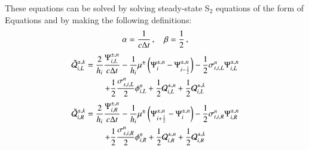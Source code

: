\documentclass[preprint,12pt]{elsarticle}
\begin{document}
These equations can be solved by solving steady-state S$_2$ equations
of the form of Equations  and  by making
the following definitions:
\begin{equation}
  \alpha = \frac{1}{c\Delta t} \, , \quad \beta = \frac{1}{2}\, ,
\end{equation}
\begin{multline}
  \tilde{\mathcal{Q}}_{i,L}^{\pm,k}
  = \frac{2}{h_i}\frac{\Psi_{i,L}^{\pm,n}}{c\Delta t}
  - \frac{1}{h_i}\mu^\pm\left( \Psi_i^{\pm,n} - \Psi_{i-\frac{1}{2}}^{\pm,n} \right)
  - \frac{1}{2}\sigma_{t,i,L}^n\Psi_{i,L}^{\pm,n}\\
  + \frac{1}{2}\frac{\sigma_{s,i,L}^n}{2}\phi_{i,L}^n
  + \frac{1}{2}\mathcal{Q}_{i,L}^{\pm,n}
  + \frac{1}{2}\mathcal{Q}_{i,L}^{\pm,k}
\end{multline}
\begin{multline}
  \tilde{\mathcal{Q}}_{i,R}^{\pm,k}
  = \frac{2}{h_i}\frac{\Psi_{i,R}^{\pm,n}}{c\Delta t}
  - \frac{1}{h_i}\mu^\pm\left( \Psi_{i+\frac{1}{2}}^{\pm,n} - \Psi_i^{\pm,n} \right)
  - \frac{1}{2}\sigma_{t,i,R}^n\Psi_{i,R}^{\pm,n}\\
  + \frac{1}{2}\frac{\sigma_{s,i,R}^n}{2}\phi_{i,R}^n
  + \frac{1}{2}\mathcal{Q}_{i,R}^{\pm,n}
  + \frac{1}{2}\mathcal{Q}_{i,R}^{\pm,k}
\end{multline}
\end{document}
